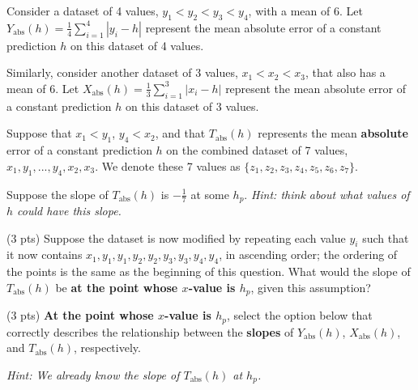 \documentclass[twoside,12pt]{article}
\begin{document}
\begin{probset}
\begin{prob}
    Consider a dataset of 4 values, $y_1 < y_2 < y_3 < y_4$, with a mean of 6. Let $Y_\text{abs}(h) = \frac{1}{4} \sum_{i = 1}^4 |y_i - h|$ represent the mean absolute error of a constant prediction $h$ on this dataset of 4 values.

    Similarly, consider another dataset of 3 values, $x_1 < x_2 < x_3$, that also has a mean of 6. Let $X_\text{abs}(h) = \frac{1}{3} \sum_{i = 1}^3 |x_i - h|$ represent the mean absolute error of a constant prediction $h$ on this dataset of 3 values.

    Suppose that $x_1 < y_1$, $y_4 < x_2$, and that $T_\text{abs}(h)$ represents the mean \textbf{absolute} error of a constant prediction $h$ on the combined dataset of 7 values, $x_1, y_1, ..., y_4, x_2, x_3$. We denote these 7 values as $\{ z_1, z_2, z_3, z_4, z_5, z_6, z_7 \}$.

    Suppose the slope of $T_\text{abs}(h)$ is $-\frac{1}{7}$ at some $h_p$. \textit{Hint: think about what values of $h$ could have this slope.}

\begin{subprobset}
    
        \begin{subprob}(3 pts)
            Suppose the dataset is now modified by repeating each value $y_i$ such that it now contains $x_1, y_1, y_1, y_2, y_2, y_3, y_3, y_4, y_4$, in ascending order; the ordering of the points is the same as the beginning of this question. What would the slope of $T_\text{abs}(h)$ be \textbf{at the point whose $x$-value is $h_p$}, given this assumption?

            \begin{responsebox}{0.5in}
            
        \end{responsebox}
        
        \end{subprob}

        \begin{subprob}(3 pts)
            \textbf{At the point whose $x$-value is $h_{p}$}, select the option below that correctly describes the relationship between the \textbf{slopes} of $Y_\text{abs}(h)$, $X_\text{abs}(h)$, and $T_\text{abs}(h)$, respectively.

            \textit{Hint: We already know the slope of $T_\text{abs}(h)$ at $h_p$.}

            \vspace{0.2em}



\end{subprob}
\end{subprobset}
\end{prob}
\end{probset}
\end{document}
